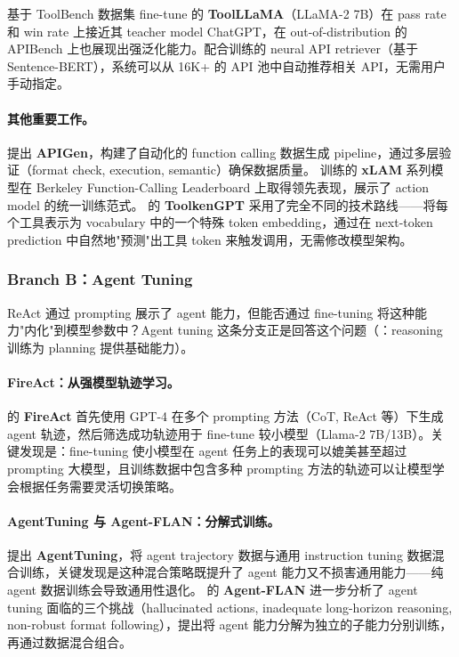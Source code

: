 基于 ToolBench 数据集 fine-tune 的 \textbf{ToolLLaMA}（LLaMA-2 7B）在 pass rate 和 win rate 上接近其 teacher model ChatGPT，在 out-of-distribution 的 APIBench 上也展现出强泛化能力。配合训练的 neural API retriever（基于 Sentence-BERT），系统可以从 16K+ 的 API 池中自动推荐相关 API，无需用户手动指定。

\paragraph{其他重要工作。}
\citet{liu2024apigen} 提出 \textbf{APIGen}，构建了自动化的 function calling 数据生成 pipeline，通过多层验证（format check, execution, semantic）确保数据质量。
\citet{zhang2024xlam} 训练的 \textbf{xLAM} 系列模型在 Berkeley Function-Calling Leaderboard 上取得领先表现，展示了 action model 的统一训练范式。
\citet{hao2023toolkengpt} 的 \textbf{ToolkenGPT} 采用了完全不同的技术路线——将每个工具表示为 vocabulary 中的一个特殊 token embedding，通过在 next-token prediction 中自然地"预测"出工具 token 来触发调用，无需修改模型架构。

\subsubsection{Branch B：Agent Tuning}

ReAct 通过 prompting 展示了 agent 能力，但能否通过 fine-tuning 将这种能力"内化"到模型参数中？Agent tuning 这条分支正是回答这个问题（：reasoning 训练为 planning 提供基础能力）。

\paragraph{FireAct：从强模型轨迹学习。}
\citet{chen2023fireact} 的 \textbf{FireAct} 首先使用 GPT-4 在多个 prompting 方法（CoT, ReAct 等）下生成 agent 轨迹，然后筛选成功轨迹用于 fine-tune 较小模型（Llama-2 7B/13B）。关键发现是：fine-tuning 使小模型在 agent 任务上的表现可以媲美甚至超过 prompting 大模型，且训练数据中包含多种 prompting 方法的轨迹可以让模型学会根据任务需要灵活切换策略。

\paragraph{AgentTuning 与 Agent-FLAN：分解式训练。}
\citet{zeng2023agenttuning} 提出 \textbf{AgentTuning}，将 agent trajectory 数据与通用 instruction tuning 数据混合训练，关键发现是这种混合策略既提升了 agent 能力又不损害通用能力——纯 agent 数据训练会导致通用性退化。\citet{chen2024agentflan} 的 \textbf{Agent-FLAN} 进一步分析了 agent tuning 面临的三个挑战（hallucinated actions, inadequate long-horizon reasoning, non-robust format following），提出将 agent 能力分解为独立的子能力分别训练，再通过数据混合组合。

